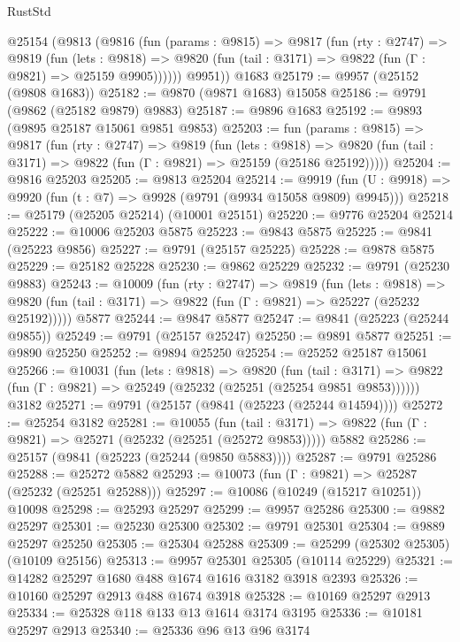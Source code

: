 \begin{lexlean}{RustStd}
\begin{coremodule}
    @25154
      (@9813
        (@9816
          (fun (params : @9815) =>
          @9817
            (fun (rty : @2747) =>
            @9819
              (fun (lets : @9818) =>
              @9820 (fun (tail : @3171) => @9822 (fun (Γ : @9821) => @25159 @9905))))))
        @9951))
    @1683
@25179 := @9957 (@25152 (@9808 @1683))
@25182 := @9870 (@9871 @1683) @15058
@25186 := @9791 (@9862 (@25182 @9879) @9883)
@25187 := @9896 @1683
@25192 := @9893 (@9895 @25187 @15061 @9851 @9853)
@25203 := fun (params : @9815) =>
  @9817
    (fun (rty : @2747) =>
    @9819
      (fun (lets : @9818) =>
      @9820 (fun (tail : @3171) => @9822 (fun (Γ : @9821) => @25159 (@25186 @25192)))))
@25204 := @9816 @25203
@25205 := @9813 @25204
@25214 := @9919
    (fun (U : @9918) => @9920 (fun (t : @7) => @9928 (@9791 (@9934 @15058 @9809) @9945)))
@25218 := @25179 (@25205 @25214) (@10001 @25151)
@25220 := @9776 @25204 @25214
@25222 := @10006 @25203 @5875
@25223 := @9843 @5875
@25225 := @9841 (@25223 @9856)
@25227 := @9791 (@25157 @25225)
@25228 := @9878 @5875
@25229 := @25182 @25228
@25230 := @9862 @25229
@25232 := @9791 (@25230 @9883)
@25243 := @10009
    (fun (rty : @2747) =>
    @9819
      (fun (lets : @9818) =>
      @9820 (fun (tail : @3171) => @9822 (fun (Γ : @9821) => @25227 (@25232 @25192)))))
    @5877
@25244 := @9847 @5877
@25247 := @9841 (@25223 (@25244 @9855))
@25249 := @9791 (@25157 @25247)
@25250 := @9891 @5877
@25251 := @9890 @25250
@25252 := @9894 @25250
@25254 := @25252 @25187 @15061
@25266 := @10031
    (fun (lets : @9818) =>
    @9820
      (fun (tail : @3171) =>
      @9822 (fun (Γ : @9821) => @25249 (@25232 (@25251 (@25254 @9851 @9853))))))
    @3182
@25271 := @9791 (@25157 (@9841 (@25223 (@25244 @14594))))
@25272 := @25254 @3182
@25281 := @10055
    (fun (tail : @3171) => @9822 (fun (Γ : @9821) => @25271 (@25232 (@25251 (@25272 @9853)))))
    @5882
@25286 := @25157 (@9841 (@25223 (@25244 (@9850 @5883))))
@25287 := @9791 @25286
@25288 := @25272 @5882
@25293 := @10073 (fun (Γ : @9821) => @25287 (@25232 (@25251 @25288)))
@25297 := @10086 (@10249 (@15217 @10251)) @10098
@25298 := @25293 @25297
@25299 := @9957 @25286
@25300 := @9882 @25297
@25301 := @25230 @25300
@25302 := @9791 @25301
@25304 := @9889 @25297 @25250
@25305 := @25304 @25288
@25309 := @25299 (@25302 @25305) (@10109 @25156)
@25313 := @9957 @25301 @25305 (@10114 @25229)
@25321 := @14282 @25297 @1680 @488 @1674 @1616 @3182 @3918 @2393
@25326 := @10160 @25297 @2913 @488 @1674 @3918
@25328 := @10169 @25297 @2913
@25334 := @25328 @118 @133 @13 @1614 @3174 @3195
@25336 := @10181 @25297 @2913
@25340 := @25336 @96 @13 @96 @3174

\end{coremodule}
\end{lexlean}

